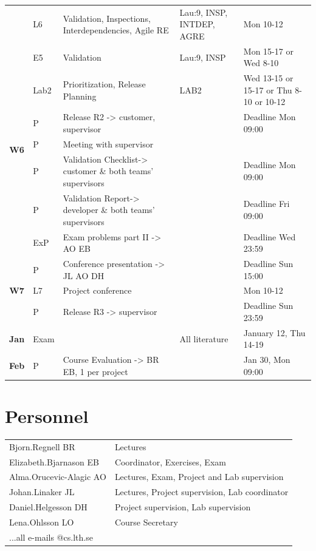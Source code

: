 \documentclass[10pt,a4paper]{article}
\begin{document}
\begin{flushleft}
\begin{tabular}{c | p{0.5cm} p{4.4cm} p{2.2cm}  p{3.2cm}}
 & L6 & Validation, Inspections, \newline Interdependencies,  Agile RE& 
 Lau:9, INSP,  INTDEP, AGRE & Mon 10-12\\
 & E5 & Validation  & Lau:9, INSP  & Mon 15-17 or Wed 8-10\\
 & Lab2 & Prioritization, Release Planning & LAB2 &  Wed 13-15 or 15-17 or Thu 8-10 or 10-12\\
 \hline
\multirow{3}{*}{{\bfseries\sffamily W6}} 
 & P & Release R2 -> customer, supervisor & & Deadline Mon 09:00  \\
 & P & Meeting with supervisor & & \\
 & P &  \multirow{1}{*}{\footnotesize Validation Checklist-> customer \& both teams' supervisors} & & Deadline Mon  09:00  \\ & P &  \multirow{1}{*}{\footnotesize Validation Report-> developer \& both teams' supervisors} & & Deadline Fri  09:00  \\
 & ExP & Exam problems part II -> AO EB && Deadline Wed 23:59 \\
 & P & Conference presentation -> JL AO DH & & Deadline Sun  15:00  \\
\hline
\multirow{1}{*}{{\bfseries\sffamily W7}} 
 & L7 & Project conference &  & Mon 10-12\\
 & P & Release R3 -> supervisor & & Deadline Sun 23:59\\
  \hline
\multirow{1}{*}{{\bfseries\sffamily Jan }} 
  & Exam & &All literature  & January 12, Thu 14-19 \\
\multirow{1}{*}{{\bfseries\sffamily Feb }}   
  &  P & \multirow{1}{*}{Course Evaluation -> BR EB, 1 per project} & & Jan 30, Mon 09:00\\

\hline
\end{tabular} 
\end{flushleft}

\section{Personnel}
\begin{flushleft}
	\setlength{\tabcolsep}{0pt}
	\begin{tabular}{p{} p{}}
		Bjorn.Regnell BR & Lectures \\
		Elizabeth.Bjarnason EB & Coordinator, Exercises, Exam \\
		Alma.Orucevic-Alagic AO & Lectures, Exam, Project and Lab supervision \\
		Johan.Linaker JL & Lectures, Project supervision, Lab coordinator \\
		Daniel.Helgesson DH & Project supervision, Lab supervision \\
		Lena.Ohlsson LO & Course Secretary \\
		...all e-mails @cs.lth.se
	\end{tabular}
\end{flushleft}
\end{document}
